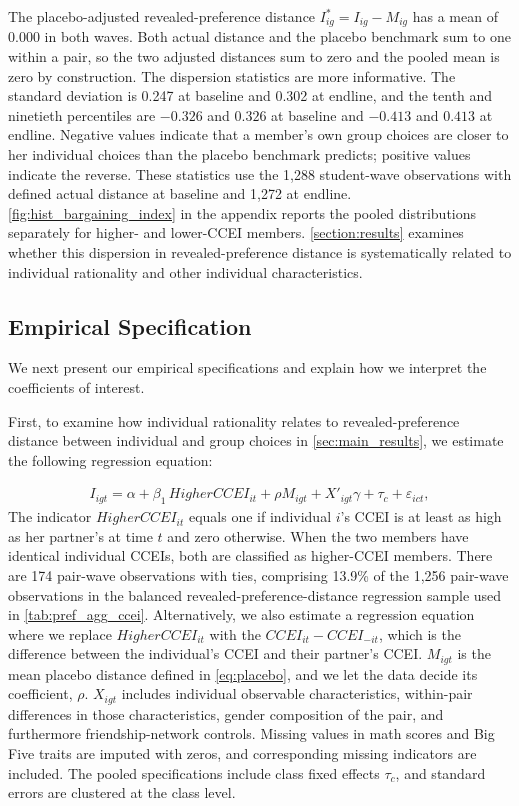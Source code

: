 \documentclass[11 pt]{article}
\begin{document}
The placebo-adjusted revealed-preference distance $I^*_{ig}=I_{ig}-M_{ig}$ has a mean of 0.000 in both waves. Both actual distance and the placebo benchmark sum to one within a pair, so the two adjusted distances sum to zero and the pooled mean is zero by construction. The dispersion statistics are more informative. The standard deviation is 0.247 at baseline and 0.302 at endline, and the tenth and ninetieth percentiles are $-0.326$ and $0.326$ at baseline and $-0.413$ and $0.413$ at endline. Negative values indicate that a member's own group choices are closer to her individual choices than the placebo benchmark predicts; positive values indicate the reverse. These statistics use the 1,288 student-wave observations with defined actual distance at baseline and 1,272 at endline. \autoref{fig:hist_bargaining_index} in the appendix reports the pooled distributions separately for higher- and lower-CCEI members.
\autoref{section:results} examines whether this dispersion in revealed-preference distance is systematically related to individual rationality and other individual characteristics.


\subsection{Empirical Specification}
We next present our empirical specifications and explain how we interpret the coefficients of interest.

First, to examine how individual rationality relates to revealed-preference distance between individual and group choices in \autoref{sec:main_results}, we estimate the following regression equation:

\begin{align}\label{eqn:individual_distance}
I_{igt} = \alpha + \beta_1\, Higher CCEI_{it} + \rho M_{igt} + X'_{igt} \gamma + \tau_c + \varepsilon_{ict},
\end{align}
The indicator $Higher CCEI_{it}$ equals one if individual $i$'s CCEI is at least as high as her partner's at time $t$ and zero otherwise. When the two members have identical individual CCEIs, both are classified as higher-CCEI members. There are 174 pair-wave observations with ties, comprising 13.9\% of the 1,256 pair-wave observations in the balanced revealed-preference-distance regression sample used in \autoref{tab:pref_agg_ccei}. Alternatively, we also estimate a regression equation where we replace $Higher CCEI_{it}$ with the $CCEI_{it}-CCEI_{-it}$, which is the difference between the individual's CCEI and their partner's CCEI. $M_{igt}$ is the mean placebo distance defined in \autoref{eq:placebo}, and we let the data decide its coefficient, $\rho$. $X_{igt}$ includes individual observable characteristics, within-pair differences in those characteristics, gender composition of the pair, and furthermore friendship-network controls. Missing values in math scores and Big Five traits are imputed with zeros, and corresponding missing indicators are included. The pooled specifications include class fixed effects $\tau_c$, and standard errors are clustered at the class level.
\end{document}
